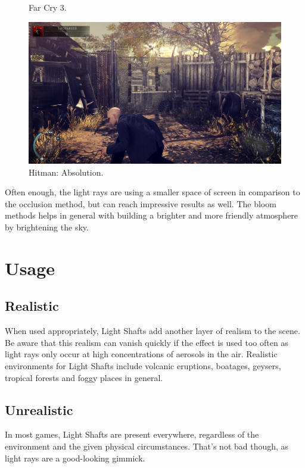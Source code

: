 \documentclass[A4]{article}
\begin{document}
\begin{figure}
		\vspace{-20px}
		\caption{Far Cry 3.}
		\begin{center}
			\includegraphics[scale=0.07]{Hitman.jpg}
		\end{center}
		\vspace{-20px}
		\caption{Hitman: Absolution.}
	\end{figure}
	Often enough, the light rays are using a smaller space of screen in comparison to the occlusion method, but can reach impressive results as well. The bloom methods helps in general with building a brighter and more friendly atmosphere by brightening the sky.
	
	\section*{Usage}
	\subsection*{Realistic}
	When used appropriately, Light Shafts add another layer of realism to the scene. Be aware that this realism can vanish quickly if the effect is used too often as light rays only occur at high concentrations of aerosols in the air. Realistic environments for Light Shafts include volcanic eruptions, boatages, geysers, tropical forests and foggy places in general.
	
	\subsection*{Unrealistic}
	In most games, Light Shafts are present everywhere, regardless of the environment and the given physical circumstances. That's not bad though, as light rays are a good-looking gimmick.
	
\end{document}
